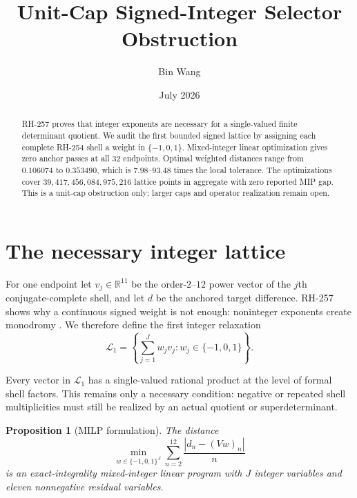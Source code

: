 \documentclass[11pt]{article}
\title{Unit-Cap Signed-Integer Selector Obstruction}
\author{Bin Wang}
\date{July 2026}
\newtheorem{proposition}[theorem]{Proposition}
\theoremstyle{remark}
\begin{document}
\maketitle

\begin{abstract}
RH-257 proves that integer exponents are necessary for a single-valued finite
determinant quotient.  We audit the first bounded signed lattice by assigning
each complete RH-254 shell a weight in $\{-1,0,1\}$.  Mixed-integer linear
optimization gives zero anchor passes at all 32 endpoints.  Optimal weighted
distances range from $0.106074$ to $0.353490$, which is $7.98$--$93.48$ times
the local tolerance.  The optimizations cover
$39{,}417{,}456{,}084{,}975{,}216$ lattice points in aggregate with zero
reported MIP gap.  This is a unit-cap obstruction only; larger caps and
operator realization remain open.
\end{abstract}

\section{The necessary integer lattice}

For one endpoint let $v_j\in\mathbb R^{11}$ be the order-$2$--$12$ power
vector of the $j$th conjugate-complete shell, and let $d$ be the anchored
target difference.  RH-257 shows why a continuous signed weight is not enough:
noninteger exponents create monodromy \citep{WangRH257}.  We therefore define
the first integer relaxation
\begin{equation}
 \mathcal L_1=\left\{\sum_{j=1}^Jw_jv_j:w_j\in\{-1,0,1\}\right\}.
 \label{eq:lattice}
\end{equation}

Every vector in $\mathcal L_1$ has a single-valued rational product at the
level of formal shell factors.  This remains only a necessary condition:
negative or repeated shell multiplicities must still be realized by an actual
quotient or superdeterminant.

\begin{proposition}[MILP formulation]
\label{prop:milp}
The distance
\begin{equation}
 \min_{w\in\{-1,0,1\}^J}
 \sum_{n=2}^{12}\frac{|d_n-(Vw)_n|}{n}
 \label{eq:objective}
\end{equation}
is an exact-integrality mixed-integer linear program with $J$ integer variables
and eleven nonnegative residual variables.
\end{proposition}
\end{document}
